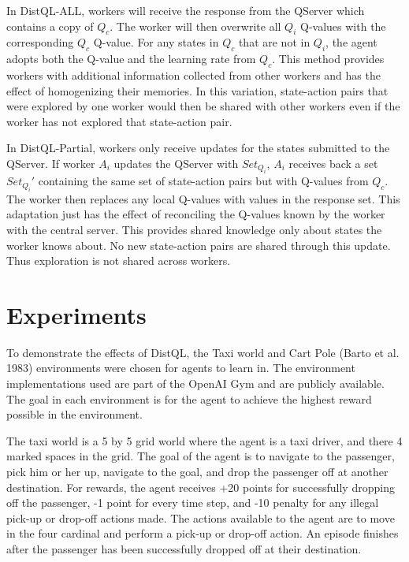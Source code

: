 \documentclass[jair,twoside,11pt,theapa]{article}
\begin{document}
In DistQL-ALL, workers will receive the response from the QServer which contains a copy of $Q_c$. The worker will then overwrite all $Q_i$ Q-values with the corresponding $Q_c$ Q-value. For any states in $Q_c$ that are not in $Q_i$, the agent adopts both the Q-value and the learning rate from $Q_c$. This method provides workers with additional information collected from other workers and has the effect of homogenizing their memories. In this variation, state-action pairs that were explored by one worker would then be shared with other workers even if the worker has not explored that state-action pair.

In DistQL-Partial, workers only receive updates for the states submitted to the QServer. If worker $A_i$ updates the QServer with $Set_{Q_i}$, $A_i$ receives back a set $Set_{Q_i}'$ containing the same set of state-action pairs but with Q-values from $Q_c$. The worker then replaces any local Q-values with values in the response set. This adaptation just has the effect of reconciling the Q-values known by the worker with the central server. This provides shared knowledge only about states the worker knows about. No new state-action pairs are shared through this update. Thus exploration is not shared across workers. 



\section{Experiments}
\label{experiments}
To demonstrate the effects of DistQL, the Taxi world \cite{Dietterich2000} and Cart Pole (Barto et al. 1983)\nocite{Barto83} environments were chosen for agents to learn in. The environment implementations used are part of the OpenAI Gym \nocite{gym} and are publicly available. The goal in each environment is for the agent to achieve the highest reward possible in the environment. 

The taxi world is a 5 by 5 grid world where the agent is a taxi driver, and there 4 marked spaces in the grid. The goal of the agent is to navigate to the passenger, pick him or her up, navigate to the goal, and drop the passenger off at another destination. For rewards, the agent receives +20 points for successfully dropping off the passenger, -1 point for every time step, and -10 penalty for any illegal pick-up or drop-off actions made. The actions available to the agent are to move in the four cardinal and perform a pick-up or drop-off action. An episode finishes after the passenger has been successfully dropped off at their destination.
\end{document}

